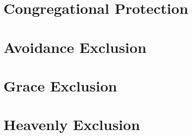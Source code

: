 \documentclass[a4paper,twocolumn,twoside,notitlepage,10pt]{article}
\begin{document}
\begin{description}[leftmargin=0pt]
  
  
  
  
  
  
  
  
  
  
  
  
  
  
  
  
  
  
  
  
  
  
  
  
  
  
  
  
  
  
  
  
  
  
  
  
  
  
  
  
  
  
  
  
  
  
  
  
  
  
  
  
  
  
  
  
  
  
  
  
  
  
  
  
  
\end{description}
\clearpage


\section{Congregational Protection}
\section{Avoidance Exclusion}
\section{Grace Exclusion}
\section{Heavenly Exclusion}
\end{document}
